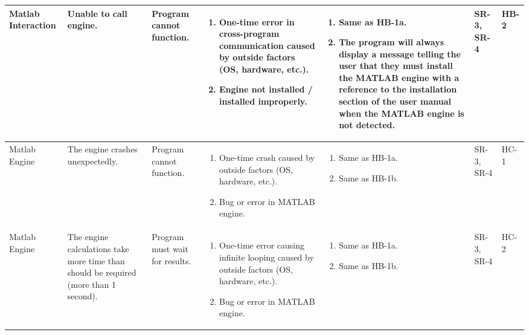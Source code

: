 \documentclass{article}
\begin{document}
\begin{landscape}
\begin{longtable}{|p{} | p{} | p{} | p{} | p{} | p{} | p{}|}
  Matlab Interaction & Unable to call engine. & Program cannot function. &
  \begin{enumerate}[leftmargin=*, label={\alph*.}, itemsep=1pt, topsep=0pt, partopsep=0pt] 
    \item One-time error in cross-program communication caused by outside factors (OS, hardware, etc.).
    \item Engine not installed / installed improperly.
  \end{enumerate} &
  \begin{enumerate}[leftmargin=*, label={\alph*.}, itemsep=1pt, topsep=0pt, partopsep=0pt] 
    \item Same as HB-1a.
    \item The program will always display a message telling the user that they must install the MATLAB engine with a 
    reference to the installation section of the user manual when the MATLAB engine is not detected.
  \end{enumerate} &
  SR-3, SR-4 & HB-2 \\

  \hline

  Matlab Engine & The engine crashes unexpectedly. & Program cannot function. &
  \begin{enumerate}[leftmargin=*, label={\alph*.}, itemsep=1pt, topsep=0pt, partopsep=0pt] 
    \item One-time crash caused by outside factors (OS, hardware, etc.).
    \item Bug or error in MATLAB engine.
  \end{enumerate} &
  \begin{enumerate}[leftmargin=*, label={\alph*.}, itemsep=1pt, topsep=0pt, partopsep=0pt] 
    \item Same as HB-1a.
    \item Same as HB-1b.
  \end{enumerate} &
  SR-3, SR-4 & HC-1 \\

  \hline

  Matlab Engine & The engine calculations take more time than should be required (more than 1 second). &
  Program must wait for results. &
  \begin{enumerate}[leftmargin=*, label={\alph*.}, itemsep=1pt, topsep=0pt, partopsep=0pt] 
    \item One-time error causing infinite looping caused by outside factors (OS, hardware, etc.).
    \item Bug or error in MATLAB engine.
  \end{enumerate} &
  \begin{enumerate}[leftmargin=*, label={\alph*.}, itemsep=1pt, topsep=0pt, partopsep=0pt] 
    \item Same as HB-1a.
    \item Same as HB-1b.
  \end{enumerate} &
  SR-3, SR-4 & HC-2 \\


\end{longtable}
\end{landscape}
\end{document}
